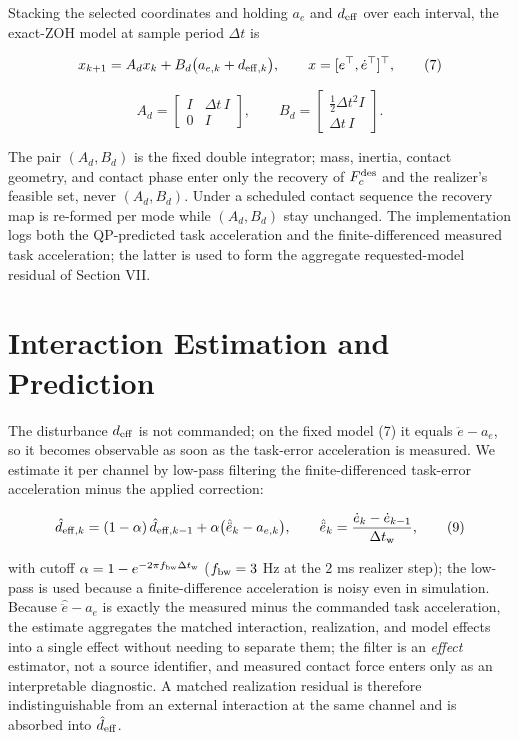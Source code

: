 \documentclass[journal]{IEEEtran}
\theoremstyle{plain}
\theoremstyle{definition}
\begin{document}
Stacking the selected coordinates and holding \(a_e\) and \(d_{\rm eff}\) over each interval, the exact-ZOH model at sample period \(\Delta t\) is

\[
x_{k+1}=A_dx_k+B_d\big(a_{e,k}+d_{{\rm eff},k}\big),\qquad
x=[e^\top,\dot e^\top]^\top,
\tag{7}
\]

\[
A_d=\begin{bmatrix}I&\Delta t\,I\\0&I\end{bmatrix},\qquad
B_d=\begin{bmatrix}\tfrac12\Delta t^2I\\\Delta t\,I\end{bmatrix}.
\tag{8}
\]

The pair \((A_d,B_d)\) is the fixed double integrator; mass, inertia, contact geometry, and contact phase enter only the recovery of \(F_c^{\rm des}\) and the realizer's feasible set, never \((A_d,B_d)\). Under a scheduled contact sequence the recovery map is re-formed per mode while \((A_d,B_d)\) stay unchanged. The implementation logs both the QP-predicted task acceleration and the finite-differenced measured task acceleration; the latter is used to form the aggregate requested-model residual of Section VII.

\section{Interaction Estimation and Prediction}\label{sec:estimation}

The disturbance \(d_{\rm eff}\) is not commanded; on the fixed model (7) it equals \(\ddot e-a_e\), so it becomes observable as soon as the task-error acceleration is measured. We estimate it per channel by low-pass filtering the finite-differenced task-error acceleration minus the applied correction:

\[
\hat d_{{\rm eff},k}=(1-\alpha)\,\hat d_{{\rm eff},k-1}
+\alpha\big(\hat{\ddot e}_k-a_{e,k}\big),\qquad
\hat{\ddot e}_k=\frac{\dot e_k-\dot e_{k-1}}{\Delta t_{\rm w}} ,
\tag{9}
\]

with cutoff \(\alpha=1-e^{-2\pi f_{\rm bw}\Delta t_{\rm w}}\) (\(f_{\rm bw}=3\) Hz at the \(2\) ms realizer step); the low-pass is used because a finite-difference acceleration is noisy even in simulation. Because \(\hat{\ddot e}-a_e\) is exactly the measured minus the commanded task acceleration, the estimate aggregates the matched interaction, realization, and model effects into a single effect without needing to separate them; the filter is an \emph{effect} estimator, not a source identifier, and measured contact force enters only as an interpretable diagnostic. A matched realization residual is therefore indistinguishable from an external interaction at the same channel and is absorbed into \(\hat d_{\rm eff}\).
\end{document}
